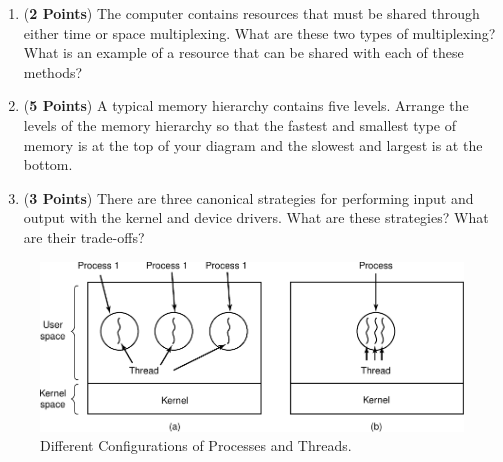 \documentclass[12pt,epsf,psfig,graphics]{article}
\begin{document}
\begin{enumerate}
\begin{enumerate}
  \item ({\bf 2 Points}) The computer contains resources that must be shared through either time or space multiplexing.
    What are these two types of multiplexing? What is an example of a resource that can be shared with each of these
    methods?
   
  \item ({\bf 5 Points}) A typical memory hierarchy contains five levels.  Arrange the levels of the memory hierarchy so
    that the fastest and smallest type of memory is at the top of your diagram and the slowest and largest is at the
    bottom.
  
  \item ({\bf 3 Points}) There are three canonical strategies for performing input and output with the
    kernel and device drivers.  What are these strategies? What are their trade-offs?

  \end{enumerate}

  \newpage



  \begin{figure}[t]
    \centering
    \includegraphics{fig2-11}
    \caption{Different Configurations of Processes and Threads.}
    \label{fig:pandt}
  \end{figure}


\end{enumerate}
\end{document}
